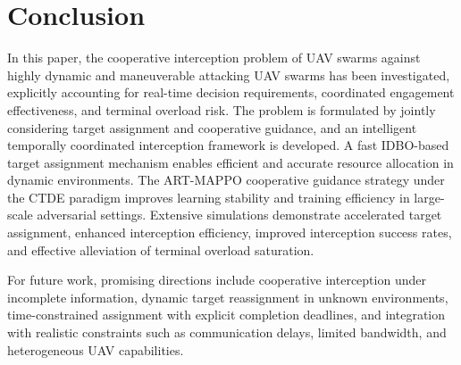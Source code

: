 \documentclass[lettersize,journal]{IEEEtran}
\begin{document}
\section{Conclusion}
\label{sec:conclusion}

In this paper, the cooperative interception problem of UAV swarms against highly dynamic and
maneuverable attacking UAV swarms has been investigated, explicitly accounting for real-time
decision requirements, coordinated engagement effectiveness, and terminal overload risk.
The problem is formulated by jointly considering target assignment and cooperative guidance,
and an intelligent temporally coordinated interception framework is developed.
A fast IDBO-based target assignment mechanism enables efficient and accurate resource
allocation in dynamic environments.
The ART-MAPPO cooperative guidance strategy under the CTDE paradigm improves learning
stability and training efficiency in large-scale adversarial settings.
Extensive simulations demonstrate accelerated target assignment, enhanced interception
efficiency, improved interception success rates, and effective alleviation of terminal overload
saturation.

For future work, promising directions include cooperative interception under incomplete
information, dynamic target reassignment in unknown environments, time-constrained assignment
with explicit completion deadlines, and integration with realistic constraints such as
communication delays, limited bandwidth, and heterogeneous UAV capabilities.



\end{document}
